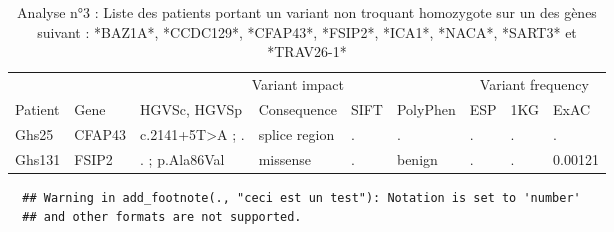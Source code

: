 \documentclass[12pt,twoside]{reedthesis}
\theoremstyle{definition}
\theoremstyle{definition}
\theoremstyle{remark}
\begin{document}
  \begin{landscape}
  \begin{longtable}[t]{lllllllll}
  \caption{\label{tab:tabgrp2moderate}Analyse n°3 : Liste des patients portant un variant non troquant homozygote sur un des gènes suivant : *BAZ1A*, *CCDC129*, *CFAP43*, *FSIP2*, *ICA1*, *NACA*, *SART3*  et  *TRAV26-1*}\\
  \toprule
  \multicolumn{1}{c}{ } & \multicolumn{1}{c}{ } & \multicolumn{4}{c}{Variant impact} & \multicolumn{3}{c}{Variant frequency} \\
  \cmidrule(l{2pt}r{2pt}){3-6} \cmidrule(l{2pt}r{2pt}){7-9}
  Patient & Gene & HGVSc, HGVSp & Consequence & SIFT & PolyPhen & ESP & 1KG & ExAC\\
  \midrule
  Ghs25 & CFAP43 & c.2141+5T>A ; . & splice region & . & . & . & . & .\\
  Ghs131 & FSIP2 & . ; p.Ala86Val & missense & . & benign & . & . & 0.00121\\
  \bottomrule
  \end{longtable}
  \end{landscape}
  
  \begin{verbatim}
  ## Warning in add_footnote(., "ceci est un test"): Notation is set to 'number'
  ## and other formats are not supported.
  \end{verbatim}
  
\end{document}
